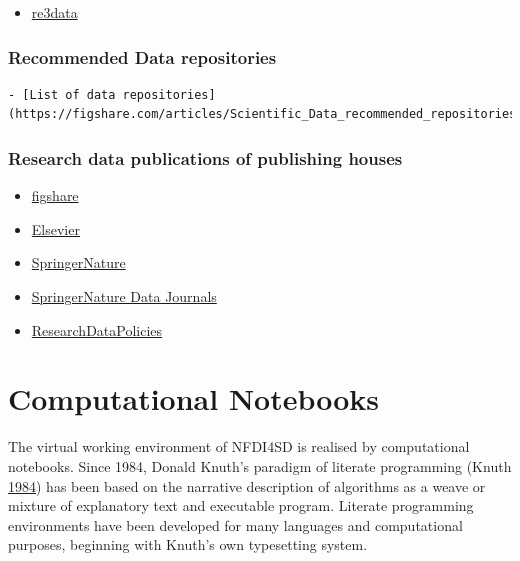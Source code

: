 \documentclass[
  english,
  paper=a4,
  oneside,captions=tableheading
]{scrbook}
\providecommand{\tightlist}{%
  \setlength{\itemsep}{0pt}\setlength{\parskip}{0pt}}
\begin{document}
\begin{itemize}
\tightlist
\item
  \href{https://www.re3data.org}{re3data}
\end{itemize}

\hypertarget{recommended-data-repositories}{%
\subsubsection{Recommended Data
repositories}\label{recommended-data-repositories}}

\begin{verbatim}
- [List of data repositories](https://figshare.com/articles/Scientific_Data_recommended_repositories_June_2015/1434640)
\end{verbatim}

\hypertarget{research-data-publications-of-publishing-houses}{%
\subsubsection{Research data publications of publishing
houses}\label{research-data-publications-of-publishing-houses}}

\begin{itemize}
\tightlist
\item
  \href{https://figshare.com/}{figshare}
\item
  \href{https://www.elsevier.com/authors/author-resources/research-data}{Elsevier}
\item
  \href{https://www.springernature.com/de/authors/research-data}{SpringerNature}
\item
  \href{https://www.springernature.com/de/authors/research-data/research-data-publishing}{SpringerNature
  Data Journals}
\item
  \href{https://www.springernature.com/gp/authors/research-data-policy}{ResearchDataPolicies}
\end{itemize}

\hypertarget{computational-notebooks}{%
\section{Computational Notebooks}\label{computational-notebooks}}

The virtual working environment of NFDI4SD is realised by computational
notebooks. Since 1984, Donald Knuth's paradigm of literate programming
(Knuth \protect\hyperlink{ref-knuth1984a}{1984}) has been based on the
narrative description of algorithms as a weave or mixture of explanatory
text and executable program. Literate programming environments have been
developed for many languages and computational purposes, beginning with
Knuth's own typesetting system.
\end{document}
